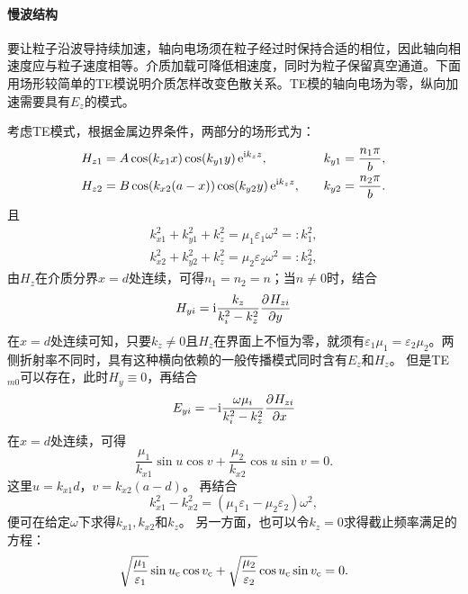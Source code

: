 \paragraph{慢波结构}
要让粒子沿波导持续加速，轴向电场须在粒子经过时保持合适的相位，因此轴向相速度应与粒子速度相等。介质加载可降低相速度，同时为粒子保留真空通道。下面用场形较简单的TE模说明介质怎样改变色散关系。TE模的轴向电场为零，纵向加速需要具有$E_z$的模式。
\begin{notecaptionblock}
    \label{fig:rectangle waveguide part-filled}
\end{notecaptionblock}
考虑TE模式，根据金属边界条件，两部分的场形式为：
\begin{alignat*}{2}
    H_{z1} &= A\cos(k_{x1}x)\cos(k_{y1}y)\mathop{}\!\mathrm{e}^{\mathrm{i} k_zz},&k_{y1} &= \frac{n_1\pi}b,\\
    H_{z2} &= B\cos(k_{x2}(a - x))\cos(k_{y2}y)\mathop{}\!\mathrm{e}^{\mathrm{i} k_zz},&\quad k_{y2} &= \frac{n_2\pi}b.
\end{alignat*}
且
\begin{subequations}
    \begin{align}
        k_{x1}^2 + k_{y1}^2 + k_z^2 = \mu_1\varepsilon_1\omega^2 =: k_1^2,\\
        k_{x2}^2 + k_{y2}^2 + k_z^2 = \mu_2\varepsilon_2\omega^2 =: k_2^2,
    \end{align}
\end{subequations}
由$H_z$在介质分界$x = d$处连续，可得$n_1 = n_2 = n$；当$n \neq 0$时，结合
\[
    H_{yi} = \mathrm{i}\frac{k_z}{k_i^2 - k_z^2}\frac{\partial^{}H_{zi}}{\partial{y}^{}}
\]
在$x = d$处连续可知，只要$k_z \neq 0$且$H_z$在界面上不恒为零，就须有$\varepsilon_1\mu_1 = \varepsilon_2\mu_2$。两侧折射率不同时，具有这种横向依赖的一般传播模式同时含有$E_z$和$H_z$。
但是TE$_{m0}$可以存在，此时$H_y \equiv 0$，再结合
\[
    E_{yi} = -\mathrm{i}\frac{\omega\mu_i}{k_i^2 - k_z^2}\frac{\partial^{}H_{zi}}{\partial{x}^{}}
\]
在$x = d$处连续，可得
\begin{equation}
    \frac{\mu_1}{k_{x1}}\sin u\cos v
        + \frac{\mu_2}{k_{x2}}\cos u\sin v = 0.
\end{equation}
这里$u = k_{x1}d$，$v = k_{x2}(a - d)$。
再结合
\begin{equation}
    k_{x1}^2 - k_{x2}^2 = (\mu_1\varepsilon_1 - \mu_2\varepsilon_2)\omega^2,
\end{equation}
便可在给定$\omega$下求得$k_{x1},k_{x2}$和$k_z$。
另一方面，也可以令$k_z = 0$求得截止频率满足的方程：
\begin{equation}
    \sqrt{\frac{\mu_1}{\varepsilon_1}}\sin u_\mathrm c\cos v_\mathrm c
    + \sqrt{\frac{\mu_2}{\varepsilon_2}}\cos u_\mathrm c\sin v_\mathrm c = 0.
\end{equation}
